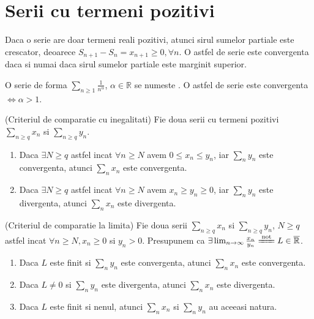 \documentclass{article}
\begin{document}
\section{Serii cu termeni pozitivi}
\begin{enumerate}

\observatie Daca o serie are doar termeni reali pozitivi, atunci sirul sumelor partiale este crescator, deoarece $S_{n+1} - S_n = x_{n+1} \geq 0, \forall n$.
\observatie O astfel de serie este convergenta daca si numai daca sirul sumelor partiale este marginit superior.

\begin{tcolorbox}
 O serie de forma $\sum_{n \geq 1} \frac{1}{n^\alpha}$, $\alpha \in \mathbb{R}$ se numeste .
\observatie O astfel de serie este convergenta $\Leftrightarrow \alpha > 1$.
\end{tcolorbox}


\begin{tcolorbox}
\propozitie (Criteriul de comparatie cu inegalitati) Fie doua serii cu termeni pozitivi $\sum_{n \geq q} x_n$ si $\sum_{n \geq q} y_n$.
  \begin{enumerate}
    \item Daca $\exists N \geq q$ astfel incat $\forall n \geq N$ avem $0 \leq x_n \leq y_n$, iar $\sum_{n} y_n$ este convergenta, atunci $\sum_{n} x_n$ este convergenta.
    \item Daca $\exists N \geq q$ astfel incat $\forall n \geq N$ avem $x_n \geq y_n \geq 0$, iar $\sum_{n} y_n$ este divergenta, atunci $\sum_{n} x_n$ este divergenta.
  \end{enumerate}
\end{tcolorbox}

\begin{tcolorbox}
  \propozitie (Criteriul de comparatie la limita) Fie doua serii $\sum_{n \geq q}x_n$ si $\sum_{n \geq q}y_n$, $N \geq q$ astfel incat $\forall n \geq N, x_n \geq 0$ si $y_n > 0$. Presupunem ca $\exists \lim_{n \to \infty} \frac{x_n}{y_n} \xlongequal{\text{not}} L \in \overline{\mathbb{R}}$.

  \begin{enumerate}
    \item Daca $L$ este finit si $\sum_{n} y_n$ este convergenta, atunci $\sum_{n} x_n$ este convergenta.
    \item Daca $L \neq 0$ si $\sum_{n} y_n$ este divergenta, atunci $\sum_{n} x_n$ este divergenta.
    \item Daca $L$ este finit si nenul, atunci $\sum_{n} x_n$ si $\sum_{n} y_n$ au aceeasi natura.


\end{enumerate}
\end{tcolorbox}
\end{enumerate}
\end{document}
